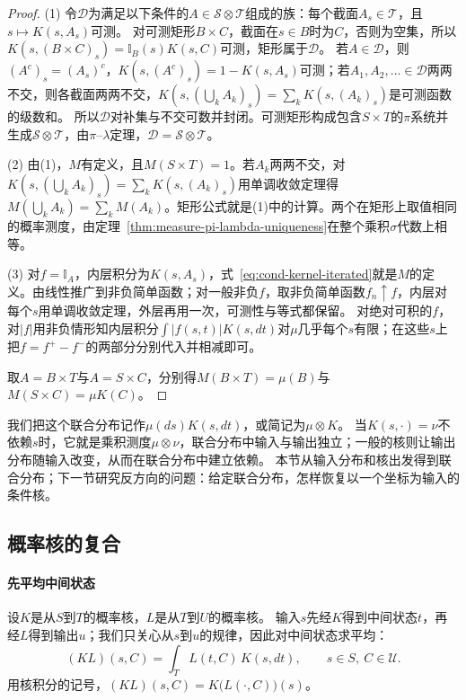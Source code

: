 \begin{proof}
(1) 令$\mathcal D$为满足以下条件的$A\in\mathcal S\otimes\mathcal T$组成的族：每个截面$A_s\in\mathcal T$，且$s\mapsto K(s,A_s)$可测。
对可测矩形$B\times C$，截面在$s\in B$时为$C$，否则为空集，所以$K(s,(B\times C)_s)=\mathbb I_B(s)K(s,C)$可测，矩形属于$\mathcal D$。
若$A\in\mathcal D$，则$(A^c)_s=(A_s)^c$，$K(s,(A^c)_s)=1-K(s,A_s)$可测；若$A_1,A_2,\ldots\in\mathcal D$两两不交，则各截面两两不交，$K(s,(\bigcup_kA_k)_s)=\sum_kK(s,(A_k)_s)$是可测函数的级数和。
所以$\mathcal D$对补集与不交可数并封闭。可测矩形构成包含$S\times T$的$\pi$系统并生成$\mathcal S\otimes\mathcal T$，由$\pi$--$\lambda$定理，$\mathcal D=\mathcal S\otimes\mathcal T$。

(2) 由(1)，$M$有定义，且$M(S\times T)=1$。若$A_k$两两不交，对$K(s,(\bigcup_kA_k)_s)=\sum_kK(s,(A_k)_s)$用单调收敛定理得$M(\bigcup_kA_k)=\sum_kM(A_k)$。矩形公式就是(1)中的计算。两个在矩形上取值相同的概率测度，由定理~\ref{thm:measure-pi-lambda-uniqueness}在整个乘积$\sigma$代数上相等。

(3) 对$f=\mathbb I_A$，内层积分为$K(s,A_s)$，式~\eqref{eq:cond-kernel-iterated}就是$M$的定义。由线性推广到非负简单函数；对一般非负$f$，取非负简单函数$f_n\uparrow f$，内层对每个$s$用单调收敛定理，外层再用一次，可测性与等式都保留。
对绝对可积的$f$，对$|f|$用非负情形知内层积分$\int|f(s,t)|K(s,dt)$对$\mu$几乎每个$s$有限；在这些$s$上把$f=f^+-f^-$的两部分分别代入并相减即可。

取$A=B\times T$与$A=S\times C$，分别得$M(B\times T)=\mu(B)$与$M(S\times C)=\mu K(C)$。
\end{proof}

我们把这个联合分布记作$\mu(ds)K(s,dt)$，或简记为$\mu\otimes K$。
当$K(s,\cdot)=\nu$不依赖$s$时，它就是乘积测度$\mu\otimes\nu$，联合分布中输入与输出独立；一般的核则让输出分布随输入改变，从而在联合分布中建立依赖。
本节从输入分布和核出发得到联合分布；下一节研究反方向的问题：给定联合分布，怎样恢复以一个坐标为输入的条件核。

\subsection{概率核的复合}

\paragraph{先平均中间状态}
设$K$是从$S$到$T$的概率核，$L$是从$T$到$U$的概率核。
输入$s$先经$K$得到中间状态$t$，再经$L$得到输出$u$；我们只关心从$s$到$u$的规律，因此对中间状态求平均：
\[
  (KL)(s,C)=\int_TL(t,C)\,K(s,dt),\qquad s\in S,\ C\in\mathcal U.
\]
用核积分的记号，$(KL)(s,C)=K\bigl(L(\cdot,C)\bigr)(s)$。

